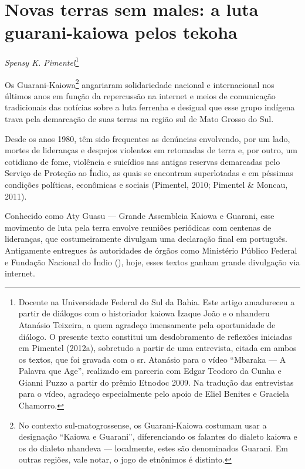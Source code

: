 \chapter{Novas terras sem males: a luta guarani-kaiowa pelos tekoha}
\begin{flushright}
\emph{Spensy K. Pimentel}\footnote{Docente na Universidade Federal do Sul da
Bahia. Este artigo amadureceu a partir de diálogos com o historiador
kaiowa Izaque João e o nhanderu Atanásio Teixeira, a quem agradeço
imensamente pela oportunidade de diálogo. O presente texto constitui um
desdobramento de reflexões iniciadas em Pimentel (2012a), sobretudo a
partir de uma entrevista, citada em ambos os textos, que foi gravada
com o sr. Atanásio para o vídeo ``Mbaraka — A Palavra que Age'',
realizado em parceria com Edgar Teodoro da Cunha e Gianni Puzzo a
partir do prêmio Etnodoc 2009. Na tradução das entrevistas para o
vídeo, agradeço especialmente pelo apoio de Eliel Benites e Graciela
Chamorro.} 
\end{flushright}

Os Guarani-Kaiowa\footnote{No contexto sul-matogrossense, os
Guarani-Kaiowa costumam usar a designação ``Kaiowa e Guarani'',
diferenciando os falantes do dialeto kaiowa e os do dialeto nhandeva —
localmente, estes são denominados Guarani. Em outras regiões, vale
notar, o jogo de etnônimos é distinto.} angariaram solidariedade
nacional e internacional nos últimos anos em função da repercussão na
internet e meios de comunicação tradicionais das notícias sobre a luta
ferrenha e desigual que esse grupo indígena trava pela demarcação de
suas terras na região sul de Mato Grosso do Sul.

Desde os anos 1980, têm sido frequentes as denúncias envolvendo, por um
lado, mortes de lideranças e despejos violentos em retomadas de terra
e, por outro, um cotidiano de fome, violência e suicídios nas antigas
reservas demarcadas pelo Serviço de Proteção ao Índio, as quais se
encontram superlotadas e em péssimas condições políticas, econômicas e
sociais (Pimentel, 2010; Pimentel \& Moncau, 2011).

Conhecido como Aty Guasu — Grande Assembleia Kaiowa e Guarani, esse
movimento de luta pela terra envolve reuniões periódicas com centenas
de lideranças, que costumeiramente divulgam uma declaração final em
português. Antigamente entregues às autoridades de órgãos como
Ministério Público Federal e Fundação Nacional do Índio (), hoje,
esses textos ganham grande divulgação via internet.

